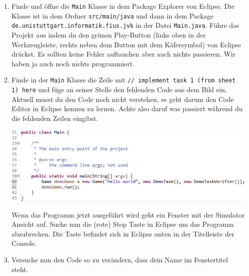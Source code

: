 \begin{enumerate}
    \item Finde und öffne die \texttt{Main} Klasse in dem Package Explorer von Eclipse.
        Die Klasse ist in dem Ordner \texttt{src/main/java} und dann in dem Package \texttt{de.unistuttgart.informatik.fius.jvk} in der Datei \texttt{Main.java}.
        Führe das Projekt aus indem du den grünen Play-Button (links oben in der Werkzeugleiste, rechts neben dem Button mit dem Käfersymbol) von Eclipse drückst.
        Es sollten keine Fehler auftauchen aber auch nichts passieren.
        Wir haben ja auch noch nichts programmiert.
    \item Finde in der \lstinline{Main} Klasse die Zeile mit \lstinline{// implement task 1 (from sheet 1) here} und füge an seiner Stelle den fehlenden Code aus dem Bild ein.
        Aktuell musst du den Code noch nicht verstehen, es geht darum den Code Editor in Eclipse kennen zu lernen.
        Achte also daruf was passiert während du die fehlenden Zeilen eingibst.

        \includegraphics[width=\linewidth]{./figures/code.1.png}

        Wenn das Programm jetzt ausgeführt wird geht ein Fenster mit der Simulator Ansicht auf.
        Suche nun die (rote) Stop Taste in Eclipse um das Programm abzubrechen.
        Die Taste befindet sich in Eclipse unten in der Titelleiste der Console.
    \item Versuche nun den Code so zu verändern, dass dein Name im Fenstertitel steht.
\end{enumerate}


